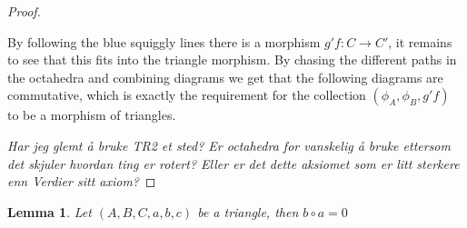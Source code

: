 \documentclass[12pt]{article}
\newtheorem{lemma}[theorem]{Lemma}
\theoremstyle{definition}
\theoremstyle{remark}
\begin{document}
\begin{proof}
\begin{minipage}[t]{0.48\textwidth}
\begin{center}
                        \end{center}
                    \end{minipage}
                    By following the blue squiggly lines there is a morphism $g'f:C\rightarrow C'$, it remains to see that this fits into the triangle morphism. By chasing the different paths in the octahedra and combining diagrams we get that the following diagrams are commutative, which is exactly the requirement for the collection $(\phi_A,\phi_B,g'f)$ to be a morphism of triangles.
                    \begin{center}
                    \end{center}

                    \emph{Har jeg glemt å bruke TR2 et sted? Er octahedra for vanskelig å bruke ettersom det skjuler hvordan ting er rotert? Eller er det dette aksiomet som er litt sterkere enn Verdier sitt axiom?}

            \end{proof}

            \begin{lemma}
                Let $(A,B,C,a,b,c)$ be a triangle, then $b\circ a=0$
            \end{lemma}
\end{document}
